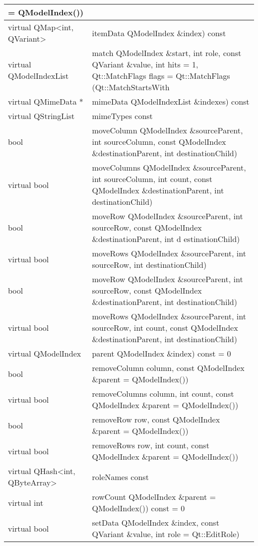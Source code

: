 \begin{longtable}{|m{10em}|m{30em}|}
              = QModelIndex())\\
\hline
virtual QMap<int, QVariant>	&itemData QModelIndex \&index) const\\
\hline
virtual QModelIndexList	& match QModelIndex \&start, int role, const QVariant \&value, int hits = 1, Qt::MatchFlags flags = Qt::MatchFlags (Qt::MatchStartsWith\\
\hline
virtual QMimeData *	&mimeData QModelIndexList \&indexes) const\\
\hline
virtual QStringList	& mimeTypes const\\
\hline
bool	&moveColumn QModelIndex \&sourceParent, int sourceColumn,
       const QModelIndex \&destinationParent, int destinationChild)\\
\hline
virtual bool & moveColumns QModelIndex \&sourceParent, int
               sourceColumn, int count, const QModelIndex
               \&destinationParent, int destinationChild)\\
\hline
bool& moveRow QModelIndex \&sourceParent, int sourceRow, const QModelIndex \&destinationParent, int d
estinationChild)\\
\hline
virtual bool &moveRows QModelIndex \&sourceParent, int sourceRow, int destinationChild)\\
\hline
bool &moveRow QModelIndex \&sourceParent, int sourceRow, 
       const QModelIndex \&destinationParent, 
       int destinationChild)\\    
\hline           
virtual bool &moveRows QModelIndex \&sourceParent, int sourceRow, 
               int count, const QModelIndex \&destinationParent, int destinationChild)\\
\hline
virtual QModelIndex&	parent QModelIndex \&index) const = 0\\
\hline
bool&	removeColumn column, const QModelIndex \&parent = QModelIndex())\\
\hline
virtual bool&	removeColumns column, int count, const QModelIndex \&parent = QModelIndex())\\
\hline
bool&	removeRow row, const QModelIndex \&parent = QModelIndex())\\
\hline
virtual bool&	removeRows row, int count, const QModelIndex \&parent = QModelIndex())\\
\hline
virtual QHash<int, QByteArray>&	roleNames const\\
\hline
virtual int	& rowCount QModelIndex \&parent = QModelIndex()) const = 0\\
\hline
virtual bool &setData QModelIndex \&index, const QVariant \&value, int role = Qt::EditRole)\\

\end{longtable}
